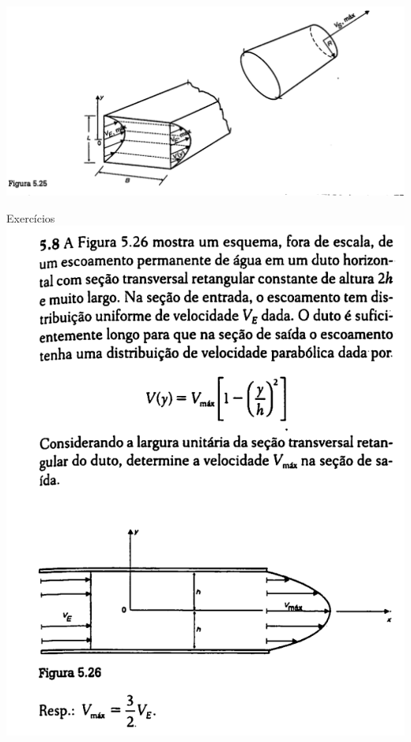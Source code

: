 \documentclass[t,%
brazilian,%
11pt,%
aspectratio=169,%
table%
]{beamer}
\begin{document}
\begin{frame}{}
    \centering
    \includegraphics[width=\textwidth]{images/Captura de tela de 2025-04-29 16-47-32.png}
\end{frame}

\begin{frame}{Exercícios}
    \includegraphics[height=\textheight-28pt]{images/Captura de tela de 2025-04-29 17-20-25.png}
\end{frame}
\end{document}
